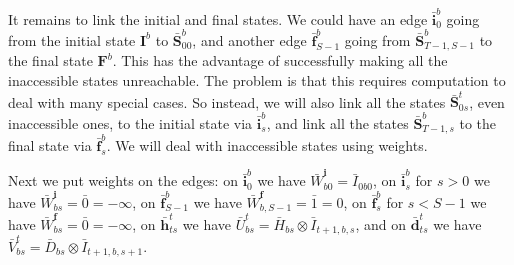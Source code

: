 \documentclass[a4paper]{article}
\begin{document}
It remains to link the initial and final states. We could have an edge $\bar{\mathbf{i}}^b_0$ going from the initial state $\mathbf{I}^b$ to $\bar{\mathbf{S}}^b_{00}$, and another edge $\bar{\mathbf{f}}^b_{S-1}$ going from $\bar{\mathbf{S}}^b_{T-1, S-1}$ to the final state $\mathbf{F}^b$. This has the advantage of successfully making all the inaccessible states unreachable. The problem is that this requires computation to deal with many special cases. So instead, we will also link all the states $\bar{\mathbf{S}}^t_{0s}$, even inaccessible ones, to the initial state via $\bar{\mathbf{i}}^b_s$, and link all the states $\bar{\mathbf{S}}^b_{T-1, s}$ to the final state via $\bar{\mathbf{f}}^b_{s}$. We will deal with inaccessible states using weights.

Next we put weights on the edges: on $\bar{\mathbf{i}}^b_0$ we have $\bar{W}^{\mathbf{i}}_{b0}=\bar{I}_{0b0}$, on $\bar{\mathbf{i}}^b_s$ for $s>0$ we have $\bar{W}^{\mathbf{i}}_{bs}=\bar{0}=-\infty$, on $\bar{\mathbf{f}}^b_{S-1}$ we have $\bar{W}^{\mathbf{f}}_{b,S-1}=\bar{1}=0$, on $\bar{\mathbf{f}}^b_{s}$ for $s<S-1$ we have $\bar{W}^{\mathbf{f}}_{bs}=\bar{0}=-\infty$, on $\bar{\mathbf{h}}^t_{ts}$ we have $\bar{U}^t_{bs}=\bar{H}_{bs}\otimes\bar{I}_{t+1,b,s}$, and on $\bar{\mathbf{d}}^t_{ts}$ we have $\bar{V}^t_{bs}=\bar{D}_{bs}\otimes\bar{I}_{t+1,b, s+1}$.
\end{document}
